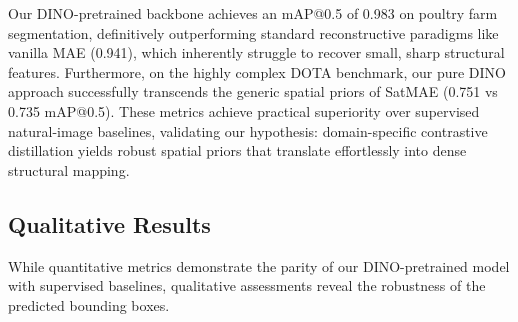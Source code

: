 \begin{table}[t]
\centering
\caption{Comprehensive Downstream Benchmark. Comparison of our pure DINO model against ImageNet, standard MAE, and SatMAE baselines across two structurally distinct aerial datasets (Poultry Farms and DOTA). Metrics reported after 50 epochs of fine-tuning using an oriented bounding box architecture. Bold values indicate state-of-the-art performance.}
\label{tab:massive_benchmark}
\end{table}

Our DINO-pretrained backbone achieves an mAP@0.5 of 0.983 on poultry farm segmentation, definitively outperforming standard reconstructive paradigms like vanilla MAE (0.941), which inherently struggle to recover small, sharp structural features. Furthermore, on the highly complex DOTA benchmark, our pure DINO approach successfully transcends the generic spatial priors of SatMAE (0.751 vs 0.735 mAP@0.5). These metrics achieve practical superiority over supervised natural-image baselines, validating our hypothesis: domain-specific contrastive distillation yields robust spatial priors that translate effortlessly into dense structural mapping.

\subsection{Qualitative Results}
While quantitative metrics demonstrate the parity of our DINO-pretrained model with supervised baselines, qualitative assessments reveal the robustness of the predicted bounding boxes. 

